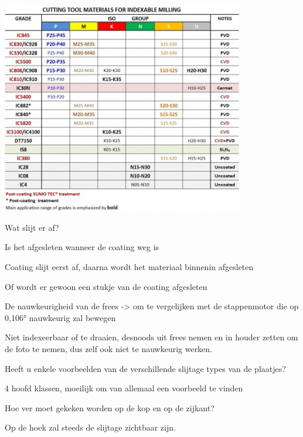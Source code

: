 \documentclass{article}
\begin{document}
\includegraphics[width=4.166667in, keepaspectratio=true]{./ZimFiles_files/Verslagen/Activiteiten_rapport/Activities/Masterproef_Tool_Wear_Inspection_-_Meeting3_TJ/plaatjes_nummers.png}



Wat slijt er af?

	Is het afgesleten wanneer de coating weg is
	
		Coating slijt eerst af, daarna wordt het materiaal binnenin afgesleten
		
	Of wordt er gewoon een stukje van de coating afgesleten
	


De nauwkeurigheid van de frees -\textgreater{} om te vergelijken met de stappenmotor die op 0,106° nauwkeurig zal bewegen 

	Niet indexeerbaar of te draaien, desnoods uit frees nemen en in houder zetten om de foto te nemen, dus zelf ook niet te nauwkeurig werken.
	
	





Heeft u enkele voorbeelden van de verschillende slijtage types van de plaatjes?

	4 hoofd klassen, moeilijk om van allemaal een voorbeeld te vinden
	




Hoe ver moet gekeken worden op de kop en op de zijkant?

	Op de hoek zal steeds de slijtage zichtbaar zijn.
	
	
\end{document}
